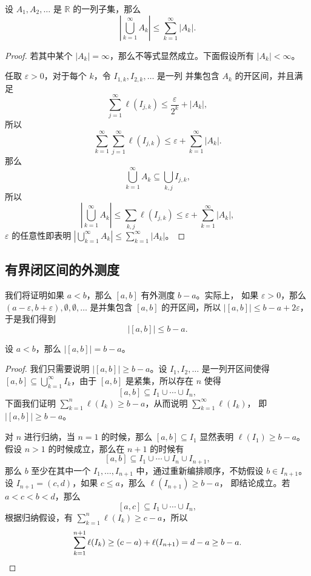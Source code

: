 \documentclass[fontset=none]{Notes}
\newcommand{\abs}[1]{\left|#1\right|}
\begin{document}
\begin{proposition}[外测度的次可加性]
  设 $A_1,A_2,\dots$ 是 $\mathbb{R}$ 的一列子集，那么
  \[
    \left|\bigcup_{k=1}^\infty A_k\right|\leq\sum_{k=1}^\infty|A_k|.
  \]
\end{proposition}
\begin{proof}
  若其中某个 $|A_k|=\infty$，那么不等式显然成立。下面假设所有 $|A_k|<\infty$。

  任取 $\varepsilon>0$，对于每个 $k$，令 $I_{1,k},I_{2,k},\dots$ 是一列
  并集包含 $A_k$ 的开区间，并且满足
  \[
    \sum_{j=1}^\infty \ell(I_{j,k})\leq\frac{\varepsilon}{2^k}+|A_k|,
  \]
  所以
  \begin{equation*}
    \sum_{k=1}^\infty\sum_{j=1}^\infty\ell(I_{j,k})\leq\varepsilon+
    \sum_{k=1}^\infty|A_k|.
  \end{equation*}
  那么 
  \[
    \bigcup_{k=1}^\infty A_k\subseteq \bigcup_{k,j}I_{j,k},
  \]
  所以
  \[
    \abs{\bigcup_{k=1}^\infty A_k}\leq \sum_{k,j}\ell(I_{j,k})
    \leq \varepsilon+\sum_{k=1}^\infty |A_k|,
  \]
  $\varepsilon$ 的任意性即表明 $\left|\bigcup_{k=1}^\infty A_k\right|\leq\sum_{k=1}^\infty|A_k|$。
\end{proof}

\subsection{有界闭区间的外测度}

我们将证明如果 $a<b$，那么 $[a,b]$ 有外测度 $b-a$。实际上，
如果 $\varepsilon>0$，那么 $(a-\varepsilon,b+\varepsilon),\emptyset,\emptyset,\dots$
是并集包含 $[a,b]$ 的开区间，所以 $\abs{[a,b]}\leq b-a+2\varepsilon$，于是我们得到
\[
  \abs{[a,b]}\leq b-a.
\]

\begin{proposition}
  设 $a<b$，那么 $\abs{[a,b]}=b-a$。
\end{proposition}
\begin{proof}
  我们只需要说明 $\abs{[a,b]}\geq b-a$。设 $I_1,I_2,\dots$ 是一列开区间使得
  $[a,b]\subseteq\bigcup_{k=1}^\infty I_k$，由于 $[a,b]$ 是紧集，所以存在
  $n$ 使得
  \[
    [a,b]\subseteq I_1\cup \cdots \cup I_n,
  \]
  下面我们证明 $\sum_{k=1}^n\ell(I_k)\geq b-a$，从而说明 $\sum_{k=1}^\infty\ell(I_k)$，
  即 $\abs{[a,b]}\geq b-a$。

  对 $n$ 进行归纳，当 $n=1$ 的时候，那么 $[a,b]\subseteq I_1$ 显然表明
  $\ell(I_1)\geq b-a$。假设 $n>1$ 的时候成立，那么在 $n+1$ 的时候有
  \[
    [a,b]\subseteq I_1\cup\cdots\cup I_n\cup I_{n+1},
  \]
  那么 $b$ 至少在其中一个 $I_1,\dots,I_{n+1}$ 中，通过重新编排顺序，不妨假设
  $b\in I_{n+1}$。设 $I_{n+1}=(c,d)$，如果 $c\leq a$，那么 $\ell(I_{n+1})\geq b-a$，
  即结论成立。若 $a<c<b<d$，那么
  \[
    [a,c]\subseteq I_1\cup\cdots \cup I_n,
  \]
  根据归纳假设，有 $\sum_{k=1}^n\ell(I_k)\geq c-a$，所以
  \[
    \sum_{k=1}^{n+1}\ell(I_k)\geq (c-a)+\ell(I_{n+1})
    =d-a\geq b-a.\qedhere
  \]
\end{proof}
\end{document}
